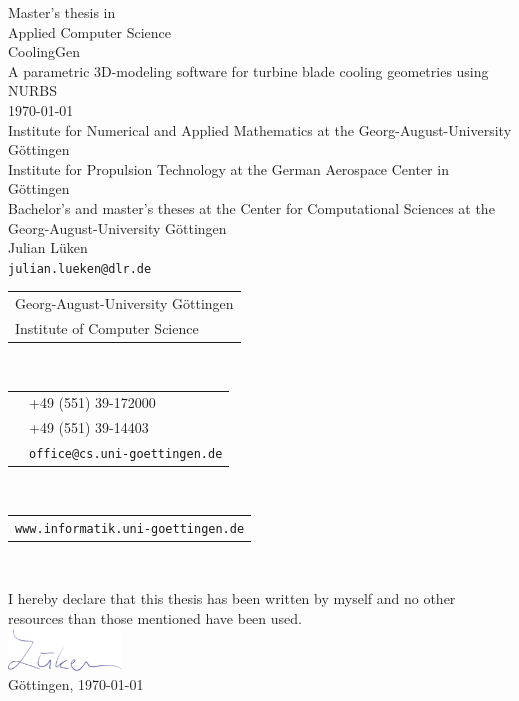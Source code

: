 \documentclass[a4paper, 11pt]{report}
\theoremstyle{definition}
\newcommand{\mytitle}[1]{\LARGE{#1}\normalsize\\[0.3em]}
\newcommand{\titlespace}{\vspace{2em}}
\newcommand{\hugespace}{\vspace{17em}}
\begin{document}
\begin{titlepage}
\begin{center}
\begin{minipage}{.49\textwidth}
\begin{center}
				Master's thesis in\\
				Applied Computer Science\\
				\titlespace
				\mytitle{CoolingGen}
				A parametric 3D-modeling software for turbine blade cooling geometries using NURBS\\
				\titlespace
				\today\\
				\hugespace
				Institute for Numerical and Applied Mathematics at the Georg-August-University Göttingen\\
				\titlespace
				Institute for Propulsion Technology at the German Aerospace Center in Göttingen\\
				\titlespace
				Bachelor's and master's theses at the Center for Computational Sciences at the Georg-August-University Göttingen\\
				\titlespace
				Julian Lüken\\
				\texttt{julian.lueken@dlr.de}\\
			\end{center}
		\end{minipage}
	\end{center}
\end{titlepage}
\pagebreak

\pagestyle{empty}
\restoregeometry
{}
\noindent
\begin{tabular}{l}
Georg-August-University Göttingen\\
Institute of Computer Science\\
\end{tabular}\\[1em]
\begin{tabular}{ll}
	\Telefon 	&+49 (551) 39-172000\\
	\FAX 		&+49 (551) 39-14403\\
	\Letter 	&\texttt{office@cs.uni-goettingen.de}\\
\end{tabular}\\[1em]
\begin{tabular}{l}
\texttt{www.informatik.uni-goettingen.de}\\
\end{tabular}\\[1em]
\pagebreak

\noindent I hereby declare that this thesis has been written by myself and no other resources than those mentioned have been used.\\[0.7em]
\phantom{H}\includegraphics[height=3em]{../assets/formal/sign.png}\\[0.5em]
Göttingen, \today \hspace{2em}
\pagebreak
\end{document}
